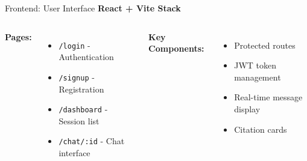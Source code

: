 \documentclass[11pt,aspectratio=16:9]{beamer}
\begin{document}
\begin{frame}{Frontend: User Interface}
    \textbf{React + Vite Stack}
    
    \begin{columns}
        \textbf{Pages:}
        \begin{itemize}
            \item \texttt{/login} - Authentication
            \item \texttt{/signup} - Registration
            \item \texttt{/dashboard} - Session list
            \item \texttt{/chat/:id} - Chat interface
        \end{itemize}
        
        \textbf{Key Components:}
        \begin{itemize}
            \item Protected routes
            \item JWT token management
            \item Real-time message display
            \item Citation cards
        \end{itemize}
    \end{columns}
    
    \vspace{0.8cm}
    
    {\small {}}
\end{frame}
\end{document}
